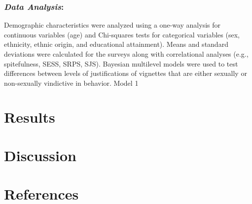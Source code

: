 \documentclass[
  english,
  a4paper]{apa7}
\begin{document}
\hypertarget{data-analysis}{%
\subsubsection{\texorpdfstring{\emph{Data Analysis}:}{Data Analysis:}}\label{data-analysis}}

Demographic characteristics were analyzed using a one-way analysis for continuous variables (age) and Chi-squares tests for categorical variables (sex, ethnicity, ethnic origin, and educational attainment). Means and standard deviations were calculated for the surveys along with correlational analyses (e.g., spitefulness, SESS, SRPS, SJS).
Bayesian multilevel models were used to test differences between levels of justifications of vignettes that are either sexually or non-sexually vindictive in behavior. Model 1

\hypertarget{results}{%
\section{Results}\label{results}}

\hypertarget{discussion}{%
\section{Discussion}\label{discussion}}

\newpage

\hypertarget{references}{%
\section{References}\label{references}}

\begingroup
\setlength{\parindent}{-0.5in}
\setlength{\leftskip}{0.5in}
\end{document}
